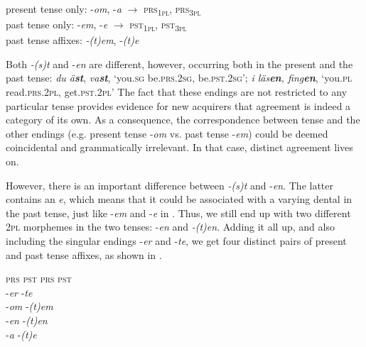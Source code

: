 \documentclass[output=paper,colorlinks,citecolor=brown,draft,draftmode]{langscibook}
\begin{document}
\ea\label{ex:petzell:28}
\ea\label{ex:petzell:28a}  present tense only:    -\textit{om}, -\textit{a}    $\to$ \textsc{prs}\textsubscript{1}\textsc{\textsubscript{pl}}, \textsc{prs}\textsubscript{3}\textsc{\textsubscript{pl}}\\
\ex\label{ex:petzell:28b}  past tense only:    -\textit{em}, -\textit{e}   $\to$ \textsc{pst}\textsubscript{1}\textsc{\textsubscript{pl}}, \textsc{pst}\textsubscript{3}\textsc{\textsubscript{pl}}  \\
\ex\label{ex:petzell:28c}  past tense affixes:   \textit{-(t)em}, -\textit{(t)e}
\z
\z


Both \textit{-(s)t} and -\textit{en} are different, however, occurring both in the present and the past tense: \textit{du ä\textbf{{st}}}, \textit{va\textbf{{st}}}, ‘you.\textsc{sg} be.\textsc{prs}.2\textsc{sg}, be.\textsc{pst}.2\textsc{sg}’; \textit{i läs\textbf{{en}}}\textit{, fing\textbf{{en}}}, ‘you.\textsc{pl} read.\textsc{prs}.2\textsc{pl}, get.\textsc{pst}.2\textsc{pl}’ The fact that these endings are not restricted to any particular tense provides evidence for new acquirers that agreement is indeed a category of its own. As a consequence, the correspondence between tense and the other endings (e.g. present tense \nobreakdash-\textit{om} vs. past tense \nobreakdash-\textit{em}) could be deemed coincidental and grammatically irrelevant. In that case, distinct agreement lives on.



However, there is an important difference between \textit{-(s)t} and -\textit{en}. The latter contains an \textit{e}, which means that it could be associated with a varying dental in the past tense, just like \nobreakdash-\textit{em} and -\textit{e} in . Thus, we still end up with two different 2\textsc{pl} morphemes in the two tenses: -\textit{en} and \textit{-(t)en}. Adding it all up, and also including the singular endings \nobreakdash-\textit{er} and \nobreakdash-\textit{te}, we get four distinct pairs of present and past tense affixes, as shown in .


\ea\label{ex:petzell:29}
\begin{tabbing}
\textsc{prs} \hspace{2\tabcolsep} \= \textsc{pst}\kill
\textsc{prs}       \>        \textsc{pst}\\
-\textit{er}       \>         -\textit{te}  \\
-\textit{om}       \>       -\textit{(t)em}  \\
-\textit{en}       \>       -\textit{(t)en}  \\
-\textit{a}        \>       -\textit{(t)e}
\end{tabbing}
\z
\end{document}
